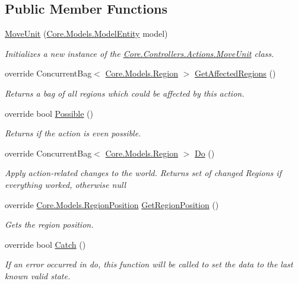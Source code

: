 \subsection*{Public Member Functions}
\begin{DoxyCompactItemize}
\item 
\hyperlink{classCore_1_1Controllers_1_1Actions_1_1MoveUnit_a323064ada90151bcd8d659ee27d87917}{Move\+Unit} (\hyperlink{classCore_1_1Models_1_1ModelEntity}{Core.\+Models.\+Model\+Entity} model)
\begin{DoxyCompactList}\small\item\em Initializes a new instance of the \hyperlink{classCore_1_1Controllers_1_1Actions_1_1MoveUnit}{Core.\+Controllers.\+Actions.\+Move\+Unit} class. \end{DoxyCompactList}\item 
override Concurrent\+Bag$<$ \hyperlink{classCore_1_1Models_1_1Region}{Core.\+Models.\+Region} $>$ \hyperlink{classCore_1_1Controllers_1_1Actions_1_1MoveUnit_a0331c4888d9efc148ecc501b4db37481}{Get\+Affected\+Regions} ()
\begin{DoxyCompactList}\small\item\em Returns a bag of all regions which could be affected by this action. \end{DoxyCompactList}\item 
override bool \hyperlink{classCore_1_1Controllers_1_1Actions_1_1MoveUnit_a6689af13f9a2f8ff90ad72d2ac327a52}{Possible} ()
\begin{DoxyCompactList}\small\item\em Returns if the action is even possible. \end{DoxyCompactList}\item 
override Concurrent\+Bag$<$ \hyperlink{classCore_1_1Models_1_1Region}{Core.\+Models.\+Region} $>$ \hyperlink{classCore_1_1Controllers_1_1Actions_1_1MoveUnit_adaf6b91a2e858d8805ea8ed83947b27a}{Do} ()
\begin{DoxyCompactList}\small\item\em Apply action-\/related changes to the world. Returns set of changed Regions if everything worked, otherwise null \end{DoxyCompactList}\item 
override \hyperlink{classCore_1_1Models_1_1RegionPosition}{Core.\+Models.\+Region\+Position} \hyperlink{classCore_1_1Controllers_1_1Actions_1_1MoveUnit_a87a9c5589011c8e86770e1b1be487381}{Get\+Region\+Position} ()
\begin{DoxyCompactList}\small\item\em Gets the region position. \end{DoxyCompactList}\item 
override bool \hyperlink{classCore_1_1Controllers_1_1Actions_1_1MoveUnit_a80ff3497561ed98a933e41f48830d947}{Catch} ()
\begin{DoxyCompactList}\small\item\em If an error occurred in do, this function will be called to set the data to the last known valid state. \end{DoxyCompactList}\end{DoxyCompactItemize}
